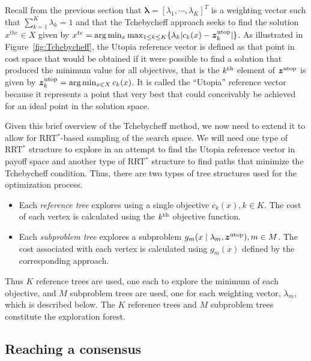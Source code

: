 \documentclass[phd]{byuprop}
\begin{document}
Recall from the previous section that  $ \bm{\lambda} = [ \lambda_{1} , \cdots , \lambda_{K}  ]^{T} $ is a weighting vector such that $ \sum_{k=1}^{K} \lambda_{k} = 1 $ and that the Tchebycheff approach seeks to find the solution $ x^{the}\in X $ given by $ x^{te} = \arg\min_x \max_{1 \leq k \leq K}  \{ \lambda_{k} | c_{k}(x) - \bm{z}^{\rm utop}_{k}  | \} $.  
As illustrated in Figure~\ref{fig:Tchebycheff}, the Utopia reference vector is defined as that point in cost space that would be obtained if it were possible to find a solution that produced the minimum value for all objectives, that is the $k^{\rm th}$ element of $\bm{z}^{\rm utop}$ is given by $\bm{z}^{\rm utop}_{k} = \arg \min_{x \in X} c_{k}(x)$.  
It is called the ``Utopia'' reference vector because it represents a point that very best that could conceivably be achieved for an ideal point in the solution space.

Given this brief overview of the Tchebycheff method, we now need to extend it to allow for RRT$^{*}$-based sampling of the search space.  
We will need one type of RRT$^{*}$ structure to explore in an attempt to find the Utopia reference vector in payoff space and another type of RRT$^{*}$ structure to find paths that minimize the Tchebycheff condition. %
Thus, there are two types of tree structures used for the optimization process.
\begin{itemize}
\item Each \emph{reference tree} explores using a single objective $ c_{k} (x), k \in K $. 
The cost of each vertex is calculated using the $ k^{\rm th} $ objective function.
\item Each \emph{subproblem tree} explores a subproblem $ g_{m} ( x \mid \lambda_{m} , \bm{z}^{\rm utop} ) , m \in M $.
The cost associated with each vertex is calculated using $ g_{m}(x) $ defined by the corresponding approach.
\end{itemize}
Thus $ K $ reference trees are used, one each to explore the minimum of each objective, and $ M $ subproblem trees are used, one for each weighting vector, $ \lambda_{m} $, which is described below.  
The $K$ reference trees and $M$ subproblem trees constitute the exploration forest.

\subsection{Reaching a consensus}
\end{document}
